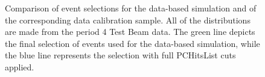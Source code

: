 \documentclass[12pt]{article}
\begin{document}
\begin{figure}[!ht]

\caption{Comparison of event selections for the data-based simulation and of the corresponding data calibration sample. All of the distributions are made from the period 4 Test Beam data. The green line depicts the final selection of events used for the data-based simulation, while the blue line represents the selection with full PCHitsList cuts applied.}
\label{figCosZSelectionComparison}
\end{figure}
\end{document}
